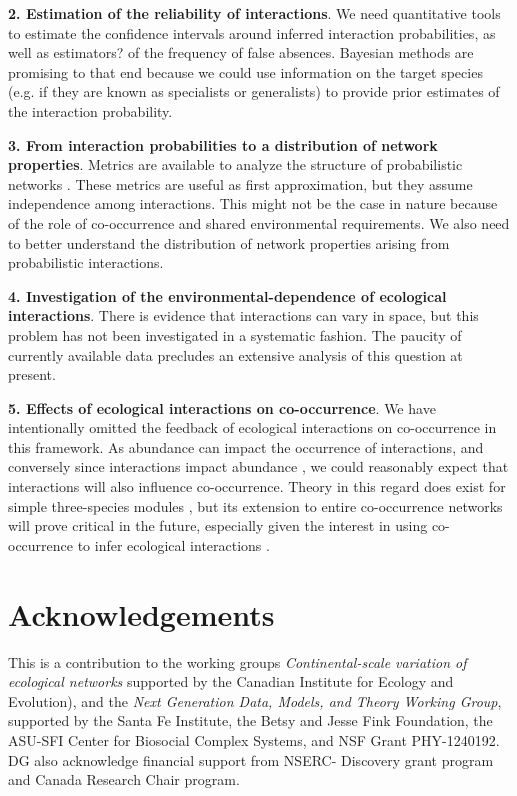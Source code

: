 \documentclass[12pt]{article}
\begin{document}
\textbf{2. Estimation of the reliability of interactions}. We need
quantitative tools to estimate the confidence intervals around inferred
interaction probabilities, as well as estimators? of the frequency of false
absences. Bayesian methods are promising to that end because we could use
information on the target species (e.g. if they are known as specialists or
generalists) to provide prior estimates of the interaction probability.

\textbf{3. From interaction probabilities to a distribution of network
properties}. Metrics are available to analyze the structure of probabilistic
networks \citep{Poisot2015c}. These metrics are useful as first approximation,
but they assume independence among interactions. This might not be the case in
nature because of the role of co-occurrence and shared environmental
requirements. We also need to better understand the distribution of network
properties arising from probabilistic interactions.

\textbf{4. Investigation of the environmental-dependence of ecological
interactions}. There is evidence that interactions can vary in space, but this
problem has not been investigated in a systematic fashion. The paucity of
currently available data precludes an extensive analysis of this question at
present.

\textbf{5. Effects of ecological interactions on co-occurrence}. We have
intentionally omitted the feedback of ecological interactions on co-occurrence
in this framework. As abundance can impact the occurrence of interactions, and
conversely since interactions impact abundance \citep{Canard2014}, we could
reasonably expect that interactions will also influence co-occurrence. Theory
in this regard does exist for simple three-species modules
\citep{Cazelles2015}, but its extension to entire co-occurrence networks will
prove critical in the future, especially given the interest in using co-
occurrence to infer ecological interactions \citep{Morales-Castilla2015,
Morueta-Holme2016}.

\section*{Acknowledgements} 

This is a contribution to the working groups \emph {Continental-scale
variation of ecological networks} supported by the Canadian Institute for
Ecology and Evolution), and the \emph{ Next Generation Data, Models, and
Theory Working Group}, supported by the Santa Fe Institute, the Betsy and
Jesse Fink Foundation, the ASU-SFI Center for Biosocial Complex Systems, and
NSF Grant PHY-1240192. DG also acknowledge financial support from NSERC-
Discovery grant program and Canada Research Chair program.
\end{document}
